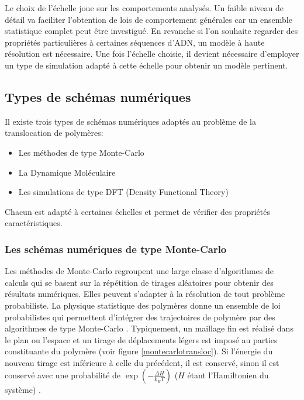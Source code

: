Le choix de l'échelle joue sur les comportements analysés. Un faible niveau de détail va faciliter l'obtention de lois de comportement générales car un ensemble statistique complet peut être investigué. En revanche si l'on souhaite regarder des propriétés particulières à certaines séquences d'ADN, un modèle à haute résolution est nécessaire. Une fois l'échelle choisie, il devient nécessaire d'employer un type de simulation adapté à cette échelle pour obtenir un modèle pertinent.


\subsection{Types de schémas numériques}

Il existe trois types de schémas numériques adaptés au problème de la translocation de polymères:
\begin{itemize}
\item Les méthodes de type Monte-Carlo
\item La Dynamique Moléculaire
\item Les simulations de type DFT (Density Functional Theory)

\end{itemize}

Chacun est adapté à certaines échelles et permet de vérifier des propriétés caractéristiques.\\

\subsubsection*{Les schémas numériques de type Monte-Carlo}  

Les méthodes de Monte-Carlo regroupent une large classe d'algorithmes de calculs qui se basent sur la répétition de tirages aléatoires pour obtenir des résultats numériques. Elles peuvent s'adapter à la résolution de tout problème probabiliste. La physique statistique des polymères donne un ensemble de loi probabilistes qui permettent d'intégrer des trajectoires de polymère par des algorithmes de type Monte-Carlo \cite{Verdier1962}. Typiquement, un maillage fin est réalisé dans le plan ou l'espace et un tirage de déplacements légers est imposé au parties constituante du polymère (voir figure \ref{montecarlotransloc}). Si l'énergie du nouveau tirage est inférieure à celle du précédent, il est conservé, sinon il est conservé avec une probabilité de $\exp(-\frac{\Delta H}{k_BT})$ ($H$ étant l'Hamiltonien du système) \cite{landau2009a}.

